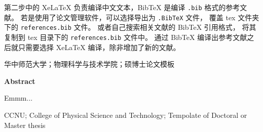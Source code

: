 第二步中的 XeLaTeX 负责编译中文文本，BibTeX 是编译 \verb!.bib! 格式的参考文献。
若是使用了论文管理软件，可以选择导出为 \verb!.BibTeX! 文件，
覆盖 tex 文件夹下的 \verb!references.bib! 文件。
或者自己搜索相关文献的 BibTeX 引用格式，
将其复制到 tex 目录下的 \verb!references.bib! 文件中。
通过 BibTeX 编译出参考文献之后就只需要选择 XeLaTeX 编译，除非增加了新的文献。

\vspace{1cm} 华中师范大学；物理科学与技术学院；硕博士论文模板



\newpage %
\headsep=0.7cm
\centerline{\bf \sanhao Abstract}
\label{abs}
\vspace{0.5cm}

Emmm...

\vspace{1cm} CCNU; College of Physical Science and Technology; Tempolate of Doctoral or Master thesis